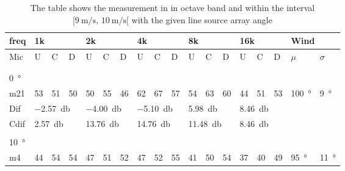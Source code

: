 \begin{table}[H]
\centering
\caption{The table shows the measurement in in octave band and within the interval $[\SI{9}{\meter\per\second},\, \SI{10}{\meter\per\second}[ $ with the given line source array angle}
\setlength\tabcolsep{5pt} %
\begin{tabular}{l|l|l|l|l|l|l|l|l|l|l|l|l|l|l|l|l|l}
freq & \multicolumn{3}{l|}{1k} & \multicolumn{3}{l|}{2k} & \multicolumn{3}{l|}{4k} & \multicolumn{3}{l|}{8k} & \multicolumn{3}{l|}{16k}   &  \multicolumn{2}{l}{Wind}                      \\ \hline
Mic  & U      & C      & D     & U      & C      & D     & U      & C      & D     & U      & C      & D     & U  & C  & D & $\mu$ & $\sigma$ \\ \hline
 & \multicolumn{3}{l|}{} & \multicolumn{3}{l|}{} & \multicolumn{3}{l|}{} & \multicolumn{3}{l|}{} & \multicolumn{3}{l|}{} &      \multicolumn{2}{l}{}                        \\ 
 \multicolumn{18}{l}{ } \\  
\SI{0}{\degree}   & \multicolumn{3}{l|}{} & \multicolumn{3}{l|}{} & \multicolumn{3}{l|}{} & \multicolumn{3}{l|}{} &  \multicolumn{3}{l|}{}   & \multicolumn{2}{l}{} \\  \hline
m21  & 53     & 51     & 50    & 50     & 55     & 46    & 62     & 67     & 57    & 54     & 63     & 60    & 44 & 51 & 53    & \SI{100}{\degree} & \SI{9}{\degree}  \\ \hline 
Dif & \multicolumn{3}{l|}{\SI{-2.57}{\decibel}} & \multicolumn{3}{l|}{\SI{-4.00}{\decibel}} & \multicolumn{3}{l|}{\SI{-5.10}{\decibel}} & \multicolumn{3}{l|}{\SI{5.98}{\decibel}} &  \multicolumn{3}{l|}{\SI{8.46}{\decibel}}  & \multicolumn{2}{l}{} \\ \hline 
Cdif & \multicolumn{3}{l|}{\SI{2.57}{\decibel}} & \multicolumn{3}{l|}{\SI{13.76}{\decibel}} & \multicolumn{3}{l|}{\SI{14.76}{\decibel}} & \multicolumn{3}{l|}{\SI{11.48}{\decibel}} & \multicolumn{3}{l|}{\SI{8.46}{\decibel}}  &   \multicolumn{2}{l}{}   \\ 
 \multicolumn{18}{l}{ } \\                             
\SI{10}{\degree}   & \multicolumn{3}{l|}{} & \multicolumn{3}{l|}{} & \multicolumn{3}{l|}{} & \multicolumn{3}{l|}{} &  \multicolumn{3}{l|}{}   & \multicolumn{2}{l}{} \\  \hline
m4    & 44     & 54     &  54    &  47    &  51    &   52   &  47    &  52     &  55    &  41     & 50     &  54    & 37 & 40 & 49   & \SI{95}{\degree} & \SI{11}{\degree}  \\

\end{tabular}
\end{table}
